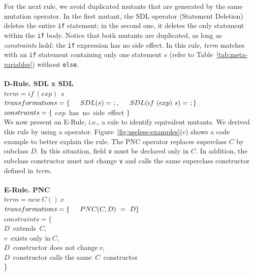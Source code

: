 For the next rule, we avoid duplicated mutants that are generated by the same mutation operator. In the first mutant, the SDL operator (Statement Deletion) deletes the entire \texttt{if} statement; in the second one, it deletes the only statement within the \texttt{if} body. Notice that both mutants are duplicated, as long as \textit{constraints} hold: the \texttt{if} expression has no side effect. In this rule, \textit{term} matches with an \texttt{if} statement containing only one statement $s$ (refer to Table~\ref{tab:meta-variables}) without \texttt{else}.
\\
\\
\textbf{D-Rule. SDL x SDL}\\
$term = if~(exp)~{~s~} $\\
$transformations = \{\\ \indent SDL(s) =~;, \\ \indent SDL(if~(exp)~s) =~; \\ \}$\\
$constraints = \{\\$ \indent $exp$~has~no~side~effect $\\\}$\\

We now present an E-Rule, i.e., a rule to identify equivalent mutants. We derived this rule by using a \mujava{} operator. Figure~\ref{fig:useless-examples}(c) shows a code example to better explain the rule. The PNC operator replaces superclass $C$ by subclass $D$. In this situation, field \texttt{v} must be declared only in $C$. In addition, the subclass constructor must not change \texttt{v} and calls the same superclass constructor defined in \textit{term}.
\\
\\
\textbf{E-Rule. PNC}\\
$term = new~C().v $\\
$transformations = \{ \\ \indent PNC(C, D)~=~D \\ \}$\\
$constraints = \{$ \\ \indent $D$~extends~$C$, \\ \indent $v$~exists only in$~C$, \\ \indent $D$~constructor does not change$~v$, \\ \indent $D$~constructor calls the same~$C$~constructor \\ \}$ $\\

